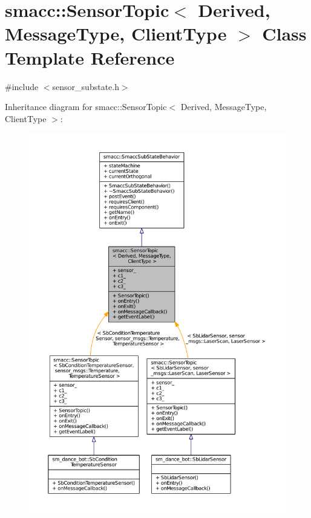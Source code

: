 \hypertarget{classsmacc_1_1SensorTopic}{}\section{smacc\+:\+:Sensor\+Topic$<$ Derived, Message\+Type, Client\+Type $>$ Class Template Reference}
\label{classsmacc_1_1SensorTopic}


{\ttfamily \#include $<$sensor\+\_\+substate.\+h$>$}



Inheritance diagram for smacc\+:\+:Sensor\+Topic$<$ Derived, Message\+Type, Client\+Type $>$\+:
\nopagebreak
\begin{figure}[H]
\begin{center}
\leavevmode
\includegraphics[width=350pt]{classsmacc_1_1SensorTopic__inherit__graph}
\end{center}
\end{figure}


